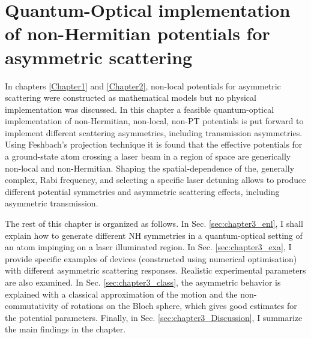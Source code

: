 
\chapter{Quantum-Optical implementation of non-Hermitian potentials for asymmetric scattering}
\label{Chapter3}

In chapters \ref{Chapter1} and \ref{Chapter2}, non-local potentials for asymmetric scattering were constructed as mathematical models but no physical implementation was discussed. In this chapter a feasible quantum-optical implementation
of non-Hermitian, non-local, non-PT potentials is put forward to implement different scattering asymmetries, including transmission
asymmetries. Using Feshbach's projection technique it is found that the effective potentials for a ground-state atom crossing a laser beam in a region of space are generically non-local and non-Hermitian. Shaping the spatial-dependence of the, generally complex, Rabi frequency, and selecting a specific laser detuning allows to produce different potential symmetries and asymmetric scattering effects, including asymmetric transmission.

The rest of this chapter is organized as follows. In Sec. \ref{sec:chapter3_enl}, I shall explain how to generate different NH symmetries in a quantum-optical setting of an atom impinging on a laser illuminated region. In Sec. \ref{sec:chapter3_exa}, I provide specific examples of devices (constructed using numerical optimisation) with different asymmetric scattering responses. Realistic experimental parameters are also examined. In Sec. \ref{sec:chapter3_class}, the asymmetric behavior is explained with a classical approximation of the motion and the non-commutativity of rotations on the Bloch sphere, which gives good estimates for the potential parameters. Finally, in Sec. \ref{sec:chapter3_Discussion}, I summarize the main findings in the chapter.

